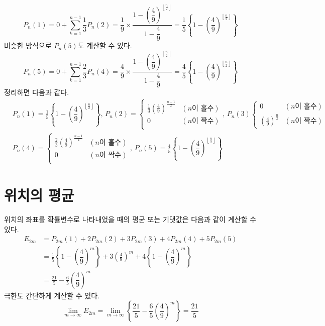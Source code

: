\documentclass{scrartcl}
\begin{document}
\[P_n(1)=0+\sum^{n-1}_{k=1}\frac{1}{3}P_n(2)=\frac{1}{9}\times\frac{1-\left(\dfrac{4}{9}\right)^{\left\lfloor\frac{n}{2}\right\rfloor}}{1-\dfrac{4}{9}}=\frac{1}{5}\left\{1-\left(\dfrac{4}{9}\right)^{\left\lfloor\frac{n}{2}\right\rfloor}\right\}\]
비슷한 방식으로 \(P_n(5)\)도 계산할 수 있다.
\[P_n(5)=0+\sum^{n-1}_{k=1}\frac{2}{3}P_n(4)=\frac{4}{9}\times\frac{1-\left(\dfrac{4}{9}\right)^{\left\lfloor\frac{n}{2}\right\rfloor}}{1-\dfrac{4}{9}}=\frac{4}{5}\left\{1-\left(\dfrac{4}{9}\right)^{\left\lfloor\frac{n}{2}\right\rfloor}\right\}\]
정리하면 다음과 같다.
\begin{align*}&P_n(1)=\frac{1}{5}\left\{1-\left(\dfrac{4}{9}\right)^{\left\lfloor\frac{n}{2}\right\rfloor}\right\},\,P_n(2)=\begin{cases}
           \frac{1}{3}\left(\frac{4}{9}\right)^\frac{n-1}{2} & (n\text{이 홀수}) \\
           0 & (n\text{이 짝수}) \\
         \end{cases},\,P_n(3)\begin{cases}
           0 & (n\text{이 홀수})\\
           \left(\frac{4}{9}\right)^\frac{n}{2} & (n\text{이 짝수})
         \end{cases}\\
&P_n(4)=\begin{cases}
                                \frac{2}{3}\left(\frac{4}{9}\right)^\frac{n-1}{2} & (n\text{이 홀수}) \\
                                0 & (n\text{이 짝수}) \\
                              \end{cases},\,P_n(5)=\frac{4}{5}\left\{1-\left(\dfrac{4}{9}\right)^{\left\lfloor\frac{n}{2}\right\rfloor}\right\}\end{align*}

\section{위치의 평균}
위치의 좌표를 확률변수로 나타내었을 때의 평균 또는 기댓값은 다음과 같이 계산할 수 있다.
\begin{align}\label{using-matrix}
E_{2m}&=P_{2m}(1)+2P_{2m}(2)+3P_{2m}(3)+4P_{2m}(4)+5P_{2m}(5) \\
&=\frac{1}{5}\left\{1-\left(\dfrac{4}{9}\right)^{m}\right\}+3\left(\frac{4}{9}\right)^m+4\left\{1-\left(\dfrac{4}{9}\right)^m\right\} \\
&=\boxed{\frac{21}{5}-\frac{6}{5}\left(\dfrac{4}{9}\right)^m}
\end{align}
극한도 간단하게 계산할 수 있다.
\[\lim_{m\to\infty}E_{2m}=\lim_{m\to\infty}\left\{\frac{21}{5}-\frac{6}{5}\left(\dfrac{4}{9}\right)^m\right\}=\boxed{\frac{21}{5}}\]
\end{document}
